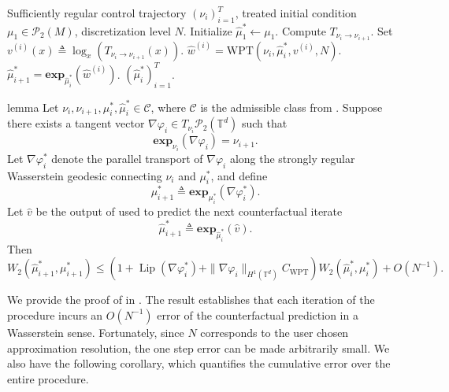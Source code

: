 \documentclass[11pt]{article}
\newcommand{\man}{M}
\begin{document}
\begin{algorithm}[h]
\caption{Counterfactual dynamics prediction via WPT}
\label{alg: W trajectory reconstruction}
\begin{algorithmic}[1]
    \Require Sufficiently regular control trajectory $(\nu_i)_{i=1}^T$, treated initial condition $\mu_1\in\mathcal P_2(\man)$, discretization level $N$.
    \State Initialize $\hat\mu_1^* \gets \mu_1$. 
        \State Compute $T_{\nu_i\to\nu_{i+1}}$.
        \State Set $v^{(i)}(x)\triangleq \log_x(T_{\nu_i\to\nu_{i+1}}(x))$. 
        \State $\hat w^{(i)} = \text{WPT}(\nu_i, \hat \mu_i^*, v^{(i)}, N)$. 
        \State $\hat\mu_{i+1}^* =  \mathbf{exp}_{\hat\mu_i^*}(\hat w^{(i)})$. 
    \EndFor
    \State \Return $(\hat\mu_i^*)_{i=1}^T$.
\end{algorithmic}
\end{algorithm}

\begin{restatable}[One step error of \Cref{alg: W trajectory reconstruction}, $\man = \mathbb{T}^d$]{lemma}{} \label{one step error of W traj reconstruction}
    Let $\nu_i,\nu_{i+1},\mu_i^*,\hat\mu_i^* \in \mathcal C$, where $\mathcal C$ is the admissible
    class from . Suppose there exists a tangent vector
    $\nabla \varphi_i \in T_{\nu_i}\mathcal P_2(\mathbb{T}^d)$ such that
    \[
    \mathbf{exp}_{\nu_i}(\nabla \varphi_i)=\nu_{i+1}.
    \]
    Let $\nabla \varphi_i^*$ denote the parallel transport of $\nabla \varphi_i$ along the strongly regular Wasserstein
    geodesic connecting $\nu_i$ and $\mu_i^*$, and define
    \[
    \mu_{i+1}^* \triangleq \mathbf{exp}_{\mu_i^*}(\nabla \varphi_i^*).
    \]
    Let $\hat v$ be the output of  used to predict the next counterfactual iterate
    \[
    \hat\mu_{i+1}^* \triangleq \mathbf{exp}_{\hat\mu_i^*}(\hat v).
    \]
    Then
    \[
    W_2(\hat\mu_{i+1}^*, \mu_{i+1}^*) \leq \left(1 + \operatorname{Lip}(\nabla \varphi_i^*) + \|\nabla \varphi_i\|_{H^1(\mathbb{T}^d)}C_{\text{WPT}} \right) W_2(\hat \mu_i^*, \mu_i^*) + O(N^{-1}).
    \]
\end{restatable}

We provide the proof of  in . The result establishes that each iteration of the procedure incurs an $O(N^{-1})$ error of the counterfactual prediction in a Wasserstein sense. Fortunately, since $N$ corresponds to the user chosen approximation resolution, the one step error can be made arbitrarily small. We also have the following corollary, which quantifies the cumulative error over the entire procedure. 
\end{document}
